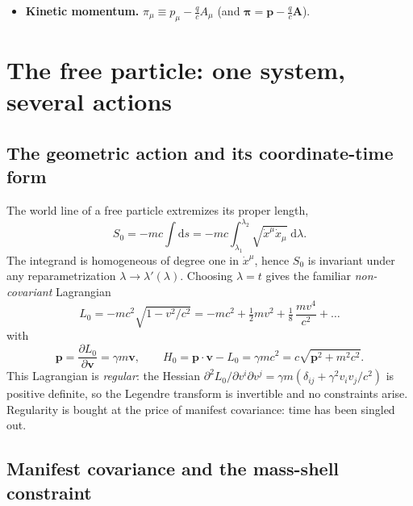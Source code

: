 \documentclass[11pt,a4paper]{book}
\numberwithin{equation}{section}
\newcommand{\dd}{\mathrm{d}}
\newcommand{\pdv}[2]{\dfrac{\partial #1}{\partial #2}}
\newcommand{\bv}{\mathbf{v}}
\newcommand{\bp}{\mathbf{p}}
\newcommand{\bA}{\mathbf{A}}
\newcommand{\bpi}{\boldsymbol{\pi}}
\theoremstyle{definition}
\theoremstyle{remark}
\begin{document}
\begin{itemize}[leftmargin=*]
\item \textbf{Kinetic momentum.}  $\pi_\mu\equiv p_\mu-\tfrac qc A_\mu$
  (and $\bpi=\bp-\tfrac qc\bA$).
\end{itemize}

\section{The free particle: one system, several actions}\label{sec:free}

\subsection{The geometric action and its coordinate-time form}

The world line of a free particle extremizes its proper length,
\begin{equation}
  S_0=-mc\int\!\dd s=-mc\int_{\lambda_1}^{\lambda_2}\!\sqrt{\dot x^\mu\dot x_\mu}\;\dd\lambda .
  \label{eq:S0}
\end{equation}
The integrand is homogeneous of degree one in $\dot x^\mu$, hence
$S_0$ is invariant under any reparametrization $\lambda\to\lambda'(\lambda)$.
Choosing $\lambda=t$ gives the familiar \emph{non-covariant} Lagrangian
\begin{equation}
  L_0=-mc^2\sqrt{1-v^2/c^2}=-mc^2+\tfrac12mv^2+\tfrac18\,\frac{mv^4}{c^2}+\dots
  \label{eq:L0-t}
\end{equation}
with
\begin{equation}
  \bp=\pdv{L_0}{\bv}=\gamma m\bv,\qquad
  H_0=\bp\!\cdot\!\bv-L_0=\gamma mc^2=c\sqrt{\bp^2+m^2c^2}.
  \label{eq:H0-t}
\end{equation}
This Lagrangian is \emph{regular}: the Hessian
$\partial^2L_0/\partial v^i\partial v^j=\gamma m(\delta_{ij}+\gamma^2v_iv_j/c^2)$
is positive definite, so the Legendre transform is invertible and no
constraints arise.  Regularity is bought at the price of manifest covariance:
time has been singled out.

\subsection{Manifest covariance and the mass-shell constraint}
\end{document}
